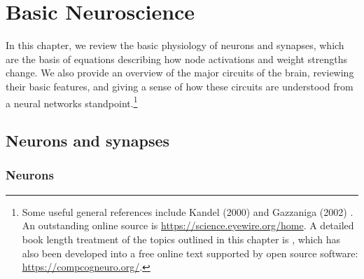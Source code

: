 \chapter{Basic Neuroscience}\label{ch_neuro}



In this chapter, we review the basic physiology of neurons and synapses, which are the basis of equations describing how node activations and weight strengths change. We also provide an overview of the major circuits of the brain, reviewing their basic features, and giving a sense of how these circuits are understood from a neural networks standpoint.\footnote{Some useful general references include Kandel (2000) \cite{kandel2000principles} and Gazzaniga (2002) \cite{gazzaniga2002cognitive}. An outstanding online source is \url{https://science.eyewire.org/home}. A detailed book length treatment of the topics outlined in this chapter is \cite{cecn_4e}, which has also been developed into a free online text supported by open source software: \url{https://compcogneuro.org/}.}  

\section{Neurons and synapses}\label{neuronsSynapses}

\subsection{Neurons}

